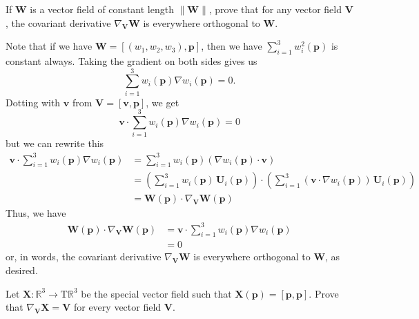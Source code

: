 \documentclass[12 pt, letterpaper]{hmcpset}
\begin{document}
\begin{problem}[Problem 1.]
	If $\mathbf{W}$ is a vector field of constant length $\lVert \mathbf{W} \rVert$, prove that for any vector field $\mathbf{V}$, the covariant derivative $\nabla_{\mathbf{V}} \mathbf{W}$ is everywhere orthogonal to $\mathbf{W}$.
\end{problem}

\begin{solution}
	Note that if we have $\mathbf{W} = [(w_{1}, w_{2}, w_{3}), \mathbf{p}]$, then we have $\sum_{i = 1}^{3} w_{i}^{2}(\mathbf{p})$ is constant always. Taking the gradient on both sides gives us
	\[
		\sum_{i = 1}^{3} w_{i}(\mathbf{p}) \nabla w_{i}(\mathbf{p}) = 0.
	\]
	Dotting with $\mathbf{v}$ from $\mathbf{V} = [\mathbf{v}, \mathbf{p}]$, we get
	\[
		\mathbf{v} \cdot \sum_{i = 1}^{3} w_{i}(\mathbf{p}) \nabla w_{i}(\mathbf{p}) = 0
	\]
	but we can rewrite this
	\[
		\begin{split}
			\mathbf{v} \cdot \sum_{i = 1}^{3} w_{i}(\mathbf{p}) \nabla w_{i}(\mathbf{p}) & = \sum_{i = 1}^{3} w_{i}(\mathbf{p}) (\nabla w_{i}(\mathbf{p}) \cdot \mathbf{v}) \\
												     & = \left ( \sum_{i = 1}^{3} w_{i}(\mathbf{p}) \, \mathbf{U}_{i}(\mathbf{p}) \right ) \cdot \left ( \sum_{i = 1}^{3} (\mathbf{v} \cdot \nabla w_{i}(\mathbf{p})) \, \mathbf{U}_{i}(\mathbf{p}) \right ) \\
												     & = \mathbf{W}(\mathbf{p}) \cdot \nabla_{\mathbf{V}} \mathbf{W} (\mathbf{p})
		\end{split}
	\]
	Thus, we have
	\[
		\begin{split}
			\mathbf{W}(\mathbf{p}) \cdot \nabla_{\mathbf{V}} \mathbf{W}(\mathbf{p}) & =  \mathbf{v} \cdot \sum_{i = 1}^{3} w_{i}(\mathbf{p}) \nabla w_{i}(\mathbf{p}) \\
												& = 0
		\end{split}
	\]
	or, in words, the covariant derivative $\nabla_{\mathbf{V}} \mathbf{W}$ is everywhere orthogonal to $\mathbf{W}$, as desired.
\end{solution}

\pagebreak

\begin{problem}[Problem 2.]
	Let $\mathbf{X} : \mathbb{R}^{3} \to \mathrm{T}\mathbb{R}^{3}$ be the special vector field such that $\mathbf{X}(\mathbf{p}) = [\mathbf{p}, \mathbf{p}]$. Prove that $\nabla_{\mathbf{V}} \mathbf{X} = \mathbf{V}$ for every vector field $\mathbf{V}$.
\end{problem}
\end{document}
